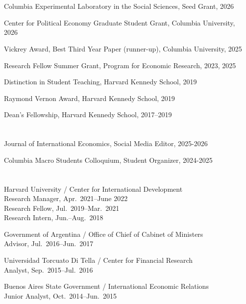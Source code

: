 \documentclass[margin,line]{res}
\newenvironment{list1}{
  \begin{list}{\ding{113}}{%
      \setlength{\itemsep}{0in}
      \setlength{\parsep}{0in} \setlength{\parskip}{0in}
      \setlength{\topsep}{0in} \setlength{\partopsep}{0in}
      \setlength{\leftmargin}{0.17in}}}{\end{list}}
\begin{document}
\begin{resume}
\section{{}}
\begin{list1}
\item[] Columbia Experimental Laboratory in the Social Sciences, Seed Grant, 2026
\item[] Center for Political Economy Graduate Student Grant, Columbia University, 2026
\item[] Vickrey Award, Best Third Year Paper (runner-up), Columbia University, 2025
\item[] Research Fellow Summer Grant, Program for Economic Research, 2023, 2025
\item[] Distinction in Student Teaching, Harvard Kennedy School, 2019
\item[] Raymond Vernon Award, Harvard Kennedy School, 2019
\item[] Dean's Fellowship, Harvard Kennedy School, 2017--2019
\end{list1}

\section{{}}
\begin{list1}
\item[] Journal of International Economics, Social Media Editor, 2025-2026
\item[] Columbia Macro Students Colloquium, Student Organizer, 2024-2025
\end{list1}

\newpage
\section{{}}

\begin{list1}
\item[] {\sc Harvard University / Center for International Development} \\
Research Manager, Apr.\ 2021--June 2022 \\
Research Fellow, Jul.\ 2019--Mar.\ 2021 \\
Research Intern, Jun.--Aug.\ 2018
\item[] {\sc Government of Argentina / Office of Chief of Cabinet of Ministers} \\
Advisor, Jul.\ 2016--Jun.\ 2017
\item[] {\sc Universidad Torcuato Di Tella / Center for Financial Research} \\
Analyst, Sep.\ 2015--Jul.\ 2016
\item[] {\sc Buenos Aires State Government / International Economic Relations}  \\
Junior Analyst, Oct.\ 2014--Jun.\ 2015
\end{list1}


\end{resume}
\end{document}
